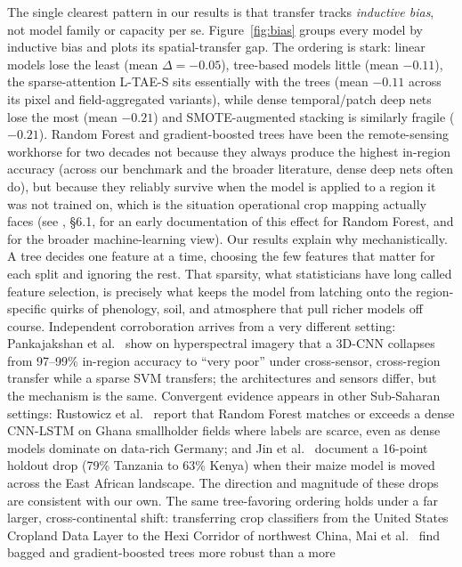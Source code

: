\documentclass[pdflatex,sn-mathphys]{sn-jnl} %
\begin{document}
The single clearest pattern in our results is that transfer tracks
\emph{inductive bias}, not model family or capacity per se. Figure~\ref{fig:bias}
groups every model by inductive bias and plots its spatial-transfer gap. The
ordering is stark: linear models lose the least (mean $\Delta=-0.05$), tree-based
models little (mean $-0.11$), the sparse-attention L-TAE-S sits essentially with
the trees (mean $-0.11$ across its pixel and field-aggregated variants), while
dense temporal/patch deep nets lose the most (mean $-0.21$) and SMOTE-augmented
stacking is similarly fragile ($-0.21$).
Random Forest and gradient-boosted trees have been the remote-sensing workhorse
for two decades not because they always produce the highest in-region accuracy
(across our benchmark and the broader literature, dense deep nets often do), but
because they reliably survive when the model is applied to a region it was not
trained on, which is the situation operational crop mapping actually faces (see
\cite{belgiu2016}, \S6.1, for an early documentation of this effect for Random Forest,
and \cite{maxwell2019} for the broader machine-learning view). Our results explain why mechanistically. A tree
decides one feature at a time, choosing the few features that matter for each split
and ignoring the rest. That sparsity, what statisticians have long called feature
selection, is precisely what keeps the model from latching onto the region-specific
quirks of phenology, soil, and atmosphere that pull richer models off course.
Independent corroboration arrives from a very different setting: Pankajakshan et al.\
\cite{pankajakshan2025} show on hyperspectral imagery that a 3D-CNN collapses from
97--99\% in-region accuracy to ``very poor'' under cross-sensor, cross-region transfer
while a sparse SVM transfers; the architectures and sensors differ, but the mechanism
is the same. Convergent evidence appears in other Sub-Saharan settings: Rustowicz
et al.\ \cite{rustowicz2019} report that Random Forest matches or exceeds a dense
CNN-LSTM on Ghana smallholder fields where labels are scarce, even as dense models
dominate on data-rich Germany; and Jin et al.\ \cite{jin2019} document a 16-point
holdout drop (79\% Tanzania to 63\% Kenya) when their maize model is moved across the
East African landscape. The direction and magnitude of these drops are consistent
with our own. The same tree-favoring ordering holds under a far larger,
cross-continental shift: transferring crop classifiers from the United States
Cropland Data Layer to the Hexi Corridor of northwest China, Mai et al.\
\cite{mai2025} find bagged and gradient-boosted trees more robust than a more
\end{document}
